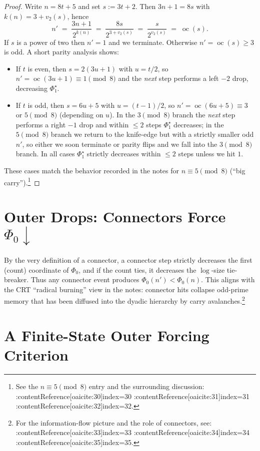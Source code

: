 \documentclass[11pt]{article}
\newcommand{\vtwo}{v_{2}}
\newcommand{\oc}{\operatorname{oc}}
\begin{document}
\begin{proof}
Write $n=8t+5$ and set $s:=3t+2$. Then $3n+1=8s$ with $k(n)=3+\vtwo(s)$, hence
\[
  n' \;=\; \frac{3n+1}{2^{k(n)}} \;=\; \frac{8s}{2^{3+\vtwo(s)}}\;=\;\frac{s}{2^{\vtwo(s)}}\;=\;\oc(s).
\]
If $s$ is a power of two then $n'=1$ and we terminate. Otherwise $n'=\oc(s)\ge 3$ is odd. A short parity analysis shows:
\begin{itemize}[leftmargin=1.25em]
  \item If $t$ is even, then $s=2(3u+1)$ with $u=t/2$, so $n'=\oc(3u+1)\equiv 1\pmod 8$ and the \emph{next} step performs a left $-2$ drop, decreasing $\Phi_1^\star$.
  \item If $t$ is odd, then $s=6u+5$ with $u=(t-1)/2$, so $n'=\oc(6u+5)\equiv 3$ or $5\pmod 8$ (depending on $u$). In the $3\pmod 8$ branch the \emph{next} step performs a right $-1$ drop and within $\le 2$ steps $\Phi_1^\star$ decreases; in the $5\pmod 8$ branch we return to the knife-edge but with a strictly smaller odd $n'$, so either we soon terminate or parity flips and we fall into the $3\pmod 8$ branch. In all cases $\Phi_1^\star$ strictly decreases within $\le 2$ steps unless we hit $1$.
\end{itemize}
These cases match the behavior recorded in the notes for $n\equiv 5\pmod 8$ (``big carry'').\footnote{See the $n\equiv 5\pmod 8$ entry and the surrounding discussion: :contentReference[oaicite:30]{index=30} :contentReference[oaicite:31]{index=31} :contentReference[oaicite:32]{index=32}.}
\end{proof}

\section{Outer Drops: Connectors Force $\Phi_0\downarrow$}

By the very definition of a connector, a connector step strictly decreases the first (count) coordinate of $\Phi_0$, and if the count ties, it decreases the $\log$-size tie-breaker. Thus any connector event produces $\Phi_0(n')<\Phi_0(n)$.
This aligns with the CRT ``radical burning'' view in the notes: connector hits collapse odd-prime memory that has been diffused into the dyadic hierarchy by carry avalanches.\footnote{For the information-flow picture and the role of connectors, see: :contentReference[oaicite:33]{index=33} :contentReference[oaicite:34]{index=34} :contentReference[oaicite:35]{index=35}.}

\section{A Finite-State Outer Forcing Criterion}
\end{document}
